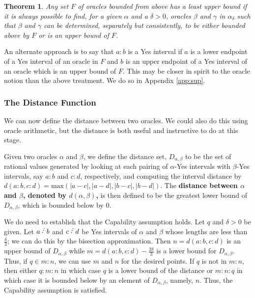 \documentclass[12pt]{article}
\newtheorem{theorem}{Theorem}[subsection]
\begin{document}
\begin{theorem}\label{th:lub}
Any set $F$ of oracles bounded from above has a least upper bound if it is always possible to find, for a given $\alpha$ and a $\delta > 0$, oracles $\beta$ and $\gamma$ in $\alpha_\delta$ such that $\beta$ and $\gamma$ can be determined, separately but consistently, to be either bounded above by $F$ or is an upper bound of $F$. 
\end{theorem}

An alternate approach is to say that $a:b$ is a Yes interval if $a$ is a lower endpoint of a Yes interval of an oracle in $F$ and $b$ is an upper endpoint of a Yes interval of an oracle which is an upper bound of $F$. This may be closer in spirit to the oracle notion than the above treatment. We do so in Appendix \ref{app:sup}. 



\subsubsection{The Distance Function}

We can now define the distance between two oracles. We could also do this using oracle arithmetic, but the distance is both useful and instructive to do at this stage. 

Given two oracles $\alpha$ and $\beta$, we define the distance set, $D_{\alpha,\beta}$ to be the set of rational values generated by looking at each pairing of $\alpha$-Yes intervals with $\beta$-Yes intervals, say  $a:b$ and $c:d$, respectively, and computing the interval distance by $d(a:b,c:d) = \mathrm{max}(|a-c|, |a-d|,|b-c|,|b-d|)$. The \textbf{distance between $\alpha$ and $\beta$, denoted by $d(\alpha,\beta)$,} is then defined to be the greatest lower bound of $D_{\alpha,\beta}$, which is bounded below by 0. 

We do need to establish that the Capability assumption holds. Let $q$ and $\delta > 0$ be given. Let $a\lte b$ and $c \lte d$ be Yes intervals of $\alpha$ and $\beta$ whose lengths are less than $\frac{\delta}{3}$; we can do this by the bisection approximation. Then $n = d(a:b, c:d)$ is an upper bound of $D_{\alpha,\beta}$ while $m = d(a:b, c:d) - \frac{2 \delta}{3}$ is a lower bound for $D_{\alpha,\beta}$. Thus, if $q \in m:n$, we can use $m$ and $n$ for the desired points. If $q$ is not in $m:n$, then either $q:m:n$ in which case $q$ is a lower bound of the distance or $m:n:q$ in which case it is bounded below by an element of $D_{\alpha,\beta}$, namely, $n$. Thus, the Capability assumption is satisfied. 
\end{document}
